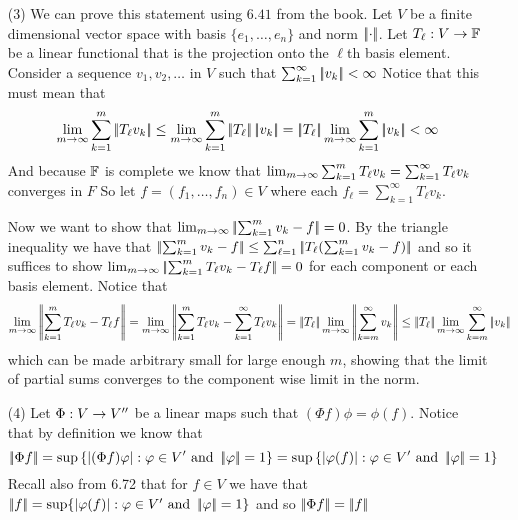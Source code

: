 \documentclass[12pt]{amsart}
\begin{document}
\begin{itemize}
   \item[(3)] We can prove this statement using $6.41$ from the book.
   Let $V$ be a finite dimensional vector space with basis $\{e_1,\dots,e_n\}$
   and norm $\norm{\cdot}$. Let $T_\ell:V\rightarrow \mathbb{F}$ be a linear functional that is the projection onto the $\ell$th basis element. 
   Consider a sequence $v_1,v_2,\dots$ in $V$ such that $\sum_{k=1}^\infty \norm{v_k} < \infty$
   Notice that this must mean that 
   \[\lim_{m\ra \infty}\sum_{k=1}^m \norm{T_\ell v_k}\leq\lim_{m\ra \infty}\sum_{k=1}^m \norm{T_\ell}\norm{v_k}
   =\norm{T_\ell}\lim_{m\ra \infty}\sum_{k=1}^m \norm{v_k}<\infty\]
   And because $\mathbb{F}$ is complete we know that $\lim_{m\rightarrow \infty}\sum_{k=1}^m T_\ell v_k =\sum_{k=1}^\infty T_\ell v_k$ converges in $F$
   So let $f=(f_1,\dots,f_n)\in V$ where each $f_\ell=\sum_{k=1}^\infty T_\ell v_k$.

   Now we want to show that $\lim_{m\ra \infty}\norm{\sum_{k=1}^m v_k-f}=0$. By the triangle inequality we 
   have that $\norm{\sum_{k=1}^m v_k-f}\leq \sum_{\ell=1}^n \norm{T_\ell(\sum_{k=1}^m v_k-f)}$ and so it
   suffices to show $\lim_{m\ra \infty}\norm{\sum_{k=1}^m T_\ell v_k-T_\ell f}=0$ for each component or each basis element.
   Notice that 
   \[\lim_{m\ra \infty}\norm{\sum_{k=1}^m T_\ell v_k-T_\ell f}=\lim_{m\ra \infty}\norm{\sum_{k=1}^m T_\ell v_k- \sum_{k=1}^\infty T_\ell v_k}=\norm{T_\ell}\lim_{m\ra \infty}\norm{\sum_{k=m}^\infty v_k}\leq\norm{T_\ell}\lim_{m\ra \infty}\sum_{k=m}^\infty\norm{ v_k}\]
   which can be made arbitrary small for large enough $m$, showing that the limit of partial sums converges to the component wise limit in the norm.

   \item[(4)] %
   Let $\Phi:V\rightarrow V''$ be a linear maps such that $(\Phi f)\phi= \phi(f)$. Notice that by definition we know 
   that 
   \[\norm{\Phi f}=\sup\left\{|(\Phi f)\phi| :\phi\in V' \text{ and }\norm{\phi}=1\right\}
   =\sup\left\{|\phi(f)| :\phi\in V' \text{ and }\norm{\phi}=1\right\}\]
   Recall also from 6.72 that for $f\in V$ we have that $\norm{f}=\sup\{|\phi(f)|: \phi\in V'\text{ and } \norm{\phi}=1\}$ and so 
   $\norm{\Phi f}=\norm{f}$


\end{itemize}
\end{document}
